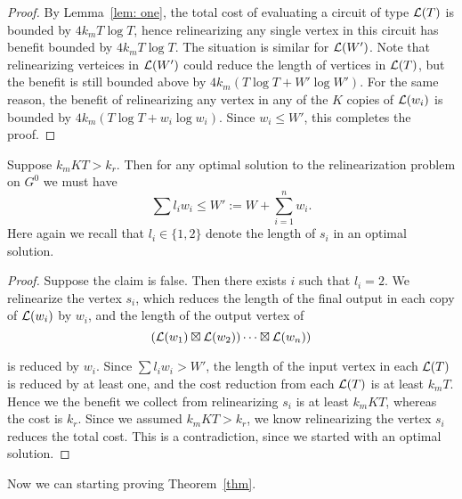 \documentclass[11pt]{article} %
\theoremstyle{plain}
\theoremstyle{definition}
\begin{document}
\begin{proof}
By Lemma~\ref{lem: one},  the total cost of evaluating a circuit of type $\mathcal{L}(T)$ is bounded by $4 k_m T\log T$, hence relinearizing any single vertex in this circuit has benefit bounded by $4k_m T\log T$. The situation is similar for $\mathcal{L}(W')$. Note that relinearizing verteices in $\mathcal{L}(W')$ 
could reduce the length of vertices in $\mathcal{L}(T)$, but the benefit is still bounded above by $4k_m(T\log T + W'\log W')$. For the same reason, the benefit of relinearizing any vertex in any of the $K$ copies of $\mathcal{L}(w_i)$ is bounded by $4k_m(T\log T + w_i \log w_i)$. Since $w_i \leq W'$, this completes
the proof.
\end{proof}


\begin{lemma} \label{lem: constraint}
Suppose $k_m KT > k_r$.  Then for any optimal solution to the relinearization problem on $G^0$ we must have 
\[
	\sum l_i w_i \leq  W':= W + \sum_{i =1}^n w_i. 
\]
Here again we recall that $l_i \in \{1, 2 \}$ denote the length of $s_i$ in an optimal solution. 
\end{lemma}



\begin{proof}
Suppose the claim is false. Then there exists $i$ such that $l_i = 2$. We relinearize the vertex $s_i$, which reduces the length of the final output in each  copy of $\mathcal{L}(w_i)$ by $w_i$, and the length of the output vertex of
$$
(\mathcal{L}(w_1) \boxtimes \mathcal{L}(w_2)) \cdots \boxtimes \mathcal{L}(w_n))$$

is reduced by $w_i$. Since $\sum l_i w_i > W'$, the length of the input vertex in each $\mathcal{L}(T)$ is reduced by at least one, and the cost reduction from each $\mathcal{L}(T)$ is at least $k_m T$. Hence we the benefit 
we collect from relinearizing $s_i$ is at least $k_m KT$, whereas the cost is $k_r$. Since we assumed $k_m KT > k_r$, we know relinearizing the vertex $s_i$ reduces  the total cost. This is a contradiction, since we started with an optimal solution. 
\end{proof}


Now we can starting proving Theorem~\ref{thm}. 
\end{document}
